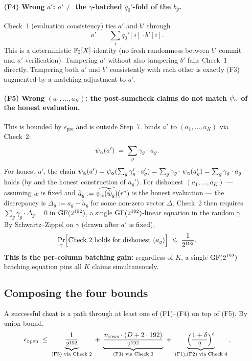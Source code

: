 \paragraph{(F4) Wrong $a'$: $a' \ne$ the $\gamma$-batched
$q_0'$-fold of the $b_g$.} Check~1 (evaluation consistency) ties
$a'$ and $b'$ through
\[
  a' \;=\; \sum_i q_0'[i] \cdot b'[i].
\]
This is a deterministic $\mathbb{F}_2[X]$-identity (no fresh randomness
between $b'$ commit and $a'$ verification). Tampering $a'$ without
also tampering $b'$ fails Check~1 directly. Tampering both $a'$ and
$b'$ consistently with each other is exactly (F3) augmented by a
matching adjustment to $a'$.

\paragraph{(F5) Wrong $(a_1, \ldots, a_K)$: the post-sumcheck claims
do not match $\psi_{\alpha}$ of the honest evaluation.} This is bounded by
$\epsilon_{\mathrm{pre}}$ and is outside Step~7. 
binds $a'$ to $(a_1, \ldots, a_K)$ via Check~2:
\[
  \psi_{\alpha}(a') \;=\; \sum_g \gamma_g \cdot a_g.
\]
For honest $a'$, the chain
$\psi_{\alpha}(a') = \psi_{\alpha}(\sum_g \gamma_g' \cdot a_g') = \sum_g \gamma_g \cdot
\psi_{\alpha}(a_g') = \sum_g \gamma_g \cdot a_g$ holds (by
 and the honest construction of $a_g'$).
For dishonest $(a_1, \ldots, a_K)$ — assuming
$\widetilde{w}$ is fixed and $\widetilde{a}_g := \widetilde{\psi_{\alpha}(\widetilde{w}_g)}(r^*)$ is
the honest evaluation — the discrepancy is $\Delta_g := a_g -
\widetilde{a}_g$ for some non-zero vector $\Delta$. Check~2 then requires
$\sum_g \gamma_g \cdot \Delta_g = 0$ in $\mathrm{GF}(2^{192})$, a single
$\mathrm{GF}(2^{192})$-linear equation in the random $\gamma$. By Schwartz–Zippel on
$\gamma$ (drawn after $a'$ is fixed),
\[
  \Pr_\gamma\Bigl[\text{Check~2 holds for dishonest } (a_g)\Bigr]
  \;\le\;
  \frac{1}{2^{192}}.
\]
\textbf{This is the per-column batching gain:} regardless of $K$, a
single $\mathrm{GF}(2^{192})$-batching equation pins all $K$ claims simultaneously.

\subsection{Composing the four bounds}

A successful cheat is a path through at least one of (F1)--(F4) on
top of (F5). By union bound,
\[
  \epsilon_{\mathrm{open}}
  \;\le\;
  \underbrace{\frac{1}{2^{192}}}_{(\text{F5}) \text{ via Check 2}}
  \;+\;
  \underbrace{\frac{n_{\mathrm{rows}} \cdot (D + 2\cdot 192)}{2^{192}}}_{(\text{F3}) \text{ via Check 3}}
  \;+\;
  \underbrace{\Bigl(\frac{1+\delta}{2}\Bigr)^{t}}_{(\text{F1}), (\text{F2}) \text{ via Check 4}}.
\]


